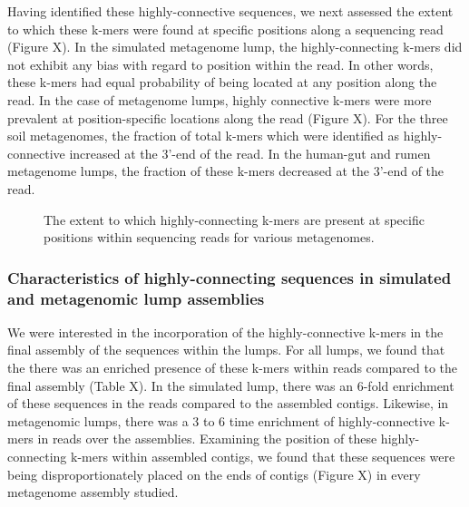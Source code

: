 \documentclass[11pt]{article} %
\begin{document}
Having identified these highly-connective sequences, we next assessed the extent to which these k-mers were found at specific positions along a sequencing read (Figure X).  In the simulated metagenome lump, the highly-connecting k-mers did not exhibit any bias with regard to position within the read.  In other words, these k-mers had equal probability of being located at any position along the read.  In the case of metagenome lumps, highly connective k-mers were more prevalent at position-specific locations along the read (Figure X).   For the three soil metagenomes, the fraction of total k-mers which were identified as highly-connective increased at the 3'-end of the read.  In the human-gut and rumen metagenome lumps, the fraction of these k-mers decreased at the 3'-end of the read.    

\begin{figure}
\caption{The extent to which highly-connecting k-mers are present at specific positions within sequencing reads for various metagenomes.}
\end{figure}


\subsubsection{Characteristics of highly-connecting sequences in simulated and metagenomic lump assemblies}

We were interested in the incorporation of the highly-connective k-mers in the final assembly of the sequences within the lumps.  For all lumps, we found that the there was an enriched presence of these k-mers within reads compared to the final assembly (Table X).  In the simulated lump, there was an 6-fold enrichment of these sequences in the reads compared to the assembled contigs.  Likewise, in metagenomic lumps, there was a 3 to 6 time enrichment of highly-connective k-mers in reads over the assemblies.  Examining the position of these highly-connecting k-mers within assembled contigs, we found that these sequences were being disproportionately placed on the ends of contigs (Figure X) in every metagenome assembly studied.  
\end{document}
